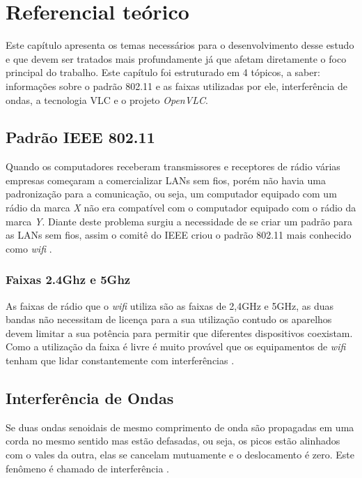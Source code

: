 \section{Referencial teórico}

Este capítulo apresenta os temas necessários para o desenvolvimento desse estudo e que devem ser tratados mais profundamente já que afetam diretamente o foco principal do trabalho. Este capítulo foi estruturado em 4 tópicos, a saber: informações sobre o padrão 802.11 e as faixas utilizadas por ele, interferência de ondas, a tecnologia VLC e o projeto \textit{OpenVLC}.

\subsection{Padrão IEEE 802.11}

Quando os computadores receberam transmissores e receptores de rádio várias empresas começaram a comercializar LANs sem fios, porém não havia uma padronização para a comunicação, ou seja, um computador equipado com um rádio da marca \emph{X} não era compatível com o computador equipado com o rádio da marca \emph{Y}. Diante deste problema surgiu a necessidade de se criar um padrão para as LANs sem fios, assim o comitê do IEEE criou o padrão 802.11 mais conhecido como \textit{wifi} \cite{tanenbaum}.

\subsubsection{Faixas 2.4Ghz e 5Ghz}

As faixas de rádio que o \textit{wifi} utiliza são as faixas de 2,4GHz e 5GHz, as duas bandas não necessitam de licença para a sua utilização contudo os aparelhos devem limitar a sua potência para permitir que diferentes dispositivos coexistam. Como a utilização da faixa é livre é muito provável que os equipamentos de \textit{wifi} tenham que lidar constantemente com interferências \cite{tanenbaum}.

\subsection{Interferência de Ondas}

Se duas ondas senoidais de mesmo comprimento de onda são propagadas em uma corda no mesmo sentido mas estão defasadas, ou seja, os picos estão alinhados com o vales da outra, elas se cancelam mutuamente e o deslocamento é zero. Este fenômeno é chamado de interferência \cite{fisica_ondas}. 

